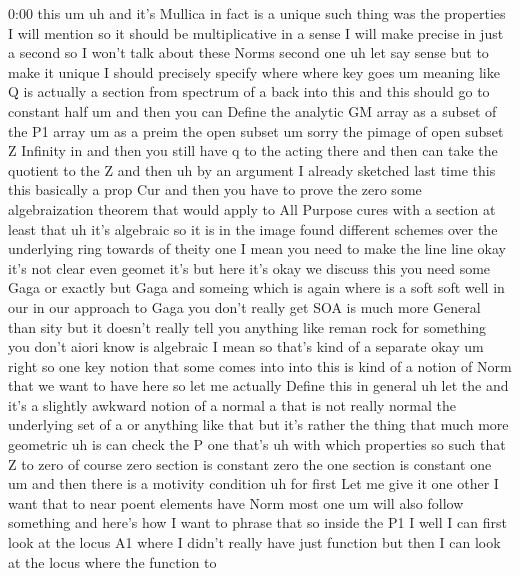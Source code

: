 \begin{unfinished}{0:00}
this
um
uh  and  it's
Mullica  in  fact  is  a  unique  such
thing  was  the  properties  I  will  mention
so  it  should  be  multiplicative  in  a
sense  I  will  make  precise  in  just  a
second  so  I  won't  talk  about  these
Norms
second
one  uh  let  say
sense  but  to  make  it  unique  I  should
precisely  specify  where  where  key
goes
um  meaning  like  Q  is  actually  a  section
from  spectrum  of  a  back  into  this  and
this  should  go  to  constant
half
um  and  then  you  can
Define  the  analytic  GM
array  as  a  subset  of  the  P1
array
um  as  a
preim  the  open  subset  um
sorry  the  pimage  of  open  subset  Z
Infinity
in  and
then  you  still  have  q  to  the  acting
there  and  then  can
take  the
quotient
to  the
Z  and
then  uh  by  an  argument  I  already
sketched  last  time  this  this  basically  a
prop
Cur  and  then  you  have  to  prove  the  zero
some  algebraization  theorem  that  would
apply  to  All  Purpose  cures  with  a
section  at  least  that  uh  it's  algebraic
so  it  is  in  the
image  found  different  schemes
over  the  underlying  ring
towards
of
theity  one  I  mean  you  need  to  make  the
line
line  okay  it's  not
clear  even
geomet  it's  but  here  it's  okay  we
discuss  this  you  need  some  Gaga  or
exactly  but
Gaga  and
someing  which  is
again  where  is  a
soft
soft  well  in  our  in  our  approach  to  Gaga
you  don't  really
get  SOA  is  much  more  General  than
sity
but  it  doesn't  really  tell  you  anything
like  reman  rock  for  something  you  don't
aiori  know  is  algebraic  I
mean  so  that's  kind  of  a
separate  okay
um  right  so  one  key  notion  that  some
comes  into  into  this  is  kind  of  a  notion
of  Norm  that  we  want  to  have  here  so  let
me  actually  Define  this  in
general
uh
let
the  and  it's  a  slightly  awkward  notion
of  a  normal  a  that  is  not  really  normal
the  underlying  set  of  a  or  anything  like
that  but  it's  rather  the  thing  that  much
more
geometric  uh
is  can  check  the  P
one  that's
uh  with  which  properties
so  such  that  Z  to  zero  of  course  zero
section  is  constant  zero  the  one  section
is  constant
one
um  and  then  there  is  a  motivity
condition  uh  for  first  Let  me  give  it
one  other  I  want  that  to  near  poent
elements  have  Norm  most
one
um  will  also  follow
something  and  here's  how  I  want  to
phrase
that  so  inside  the  P1  I  well  I  can  first
look  at  the  locus  A1  where  I  didn't
really  have  just  function  but  then  I  can
look  at  the  locus  where  the  function  to

\end{unfinished}
